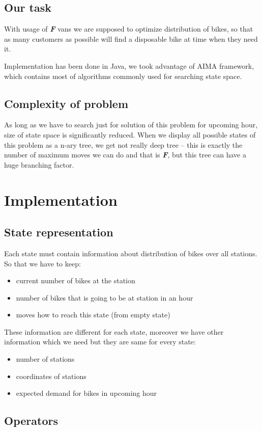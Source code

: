 \documentclass[11pt,twoside,a4paper]{mr}%
\begin{document}
\section{Our task}
With usage of \textbf{\textsl{F}} vans we are supposed to optimize distribution of bikes, so that as many customers as possible will find a disposable bike at time when they need it.

Implementation has been done in Java, we took advantage of AIMA framework\cite{aima}, which contains most of algorithms commonly used for  searching state space.

\section{Complexity of problem}
As long as we have to search just for solution of this problem for upcoming hour, size of state space is significantly reduced. When we display all possible states of this problem as a n-ary tree, we get not really deep tree -- this is exactly the number of maximum moves we can do and that is \textbf{\textsl{F}}, but this tree can have a huge branching factor. 


\chapter{Implementation}
\section{State representation} 
Each state must contain information about distribution of bikes over all stations. So that we have to keep:
\begin{itemize}
\item current number of bikes at the station
\item number of bikes that is going to be at station in an hour 
\item moves how to reach this state (from empty state)
\end{itemize}
These information are different for each state, moreover we have other information which we need but they are same for every state:
\begin{itemize}
 \item number of stations
 \item coordinates of stations
 \item expected demand for bikes in upcoming hour
\end{itemize}


\section{Operators}
\end{document}

